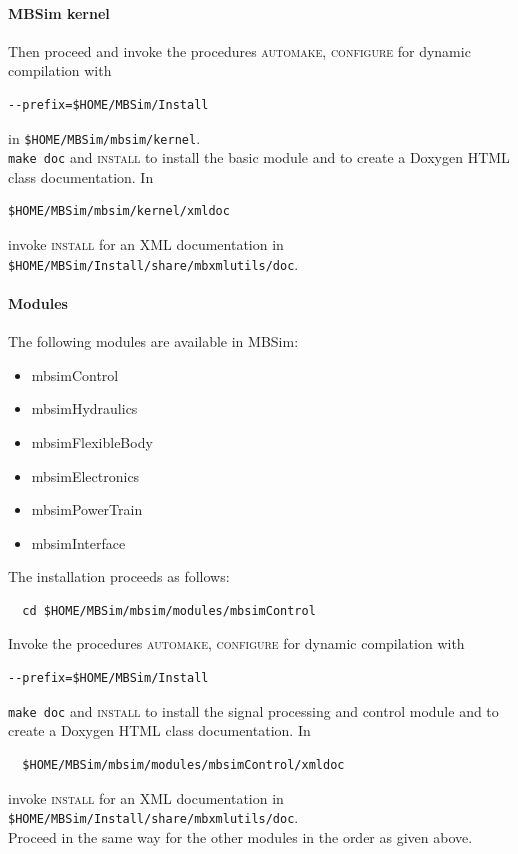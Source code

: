 \paragraph{MBSim kernel}
Then proceed and invoke the procedures \textsc{automake, configure} for dynamic compilation with
\begin{verbatim}
--prefix=$HOME/MBSim/Install
\end{verbatim}
in \texttt{\$HOME/MBSim/mbsim/kernel}.\\
%
\texttt{make doc} and \textsc{install} to install the basic module and to create a Doxygen HTML class documentation. In
\begin{verbatim}
$HOME/MBSim/mbsim/kernel/xmldoc
\end{verbatim}
invoke \textsc{install} for an XML documentation in\\
\texttt{\$HOME/MBSim/Install/share/mbxmlutils/doc}.
%
\paragraph{Modules}
The following modules are available in MBSim:
%
\begin{itemize}
  \item mbsimControl
  \item mbsimHydraulics
  \item mbsimFlexibleBody
  \item mbsimElectronics
  \item mbsimPowerTrain
  \item mbsimInterface
\end{itemize}
%
The installation proceeds as follows:
\begin{verbatim}
  cd $HOME/MBSim/mbsim/modules/mbsimControl
\end{verbatim}
Invoke the procedures \textsc{automake, configure} for dynamic compilation with
\begin{verbatim}
--prefix=$HOME/MBSim/Install
\end{verbatim}
\texttt{make doc} and \textsc{install} to install the signal processing and control module and to create a Doxygen HTML class documentation. In 
\begin{verbatim}
  $HOME/MBSim/mbsim/modules/mbsimControl/xmldoc
\end{verbatim}
invoke \textsc{install} for an XML documentation in\\
\texttt{\$HOME/MBSim/Install/share/mbxmlutils/doc}.\\
%
Proceed in the same way for the other modules in the order as given above.
%
